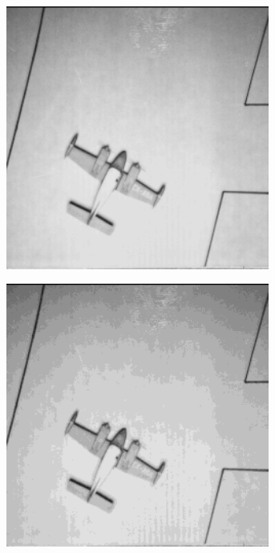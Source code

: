 \begin{figure}
\begin{subfigure}[b]{.23\textwidth}
  \caption{}
  \label{fig:test-images-airplane-truncate1}
\end{subfigure}
\begin{subfigure}[b]{.23\textwidth}
  \centering
  \includegraphics[width=0.95\textwidth]{figures/test-images/truncate2/airplane}
  \caption{}
  \label{fig:test-images-airplane-truncate2}
\end{subfigure}
\begin{subfigure}[b]{.23\textwidth}
  \centering
  \includegraphics[width=0.95\textwidth]{figures/test-images/truncate4/airplane}
  \caption{}
  \label{fig:test-images-airplane-truncate4}
\end{subfigure}


\end{figure}
